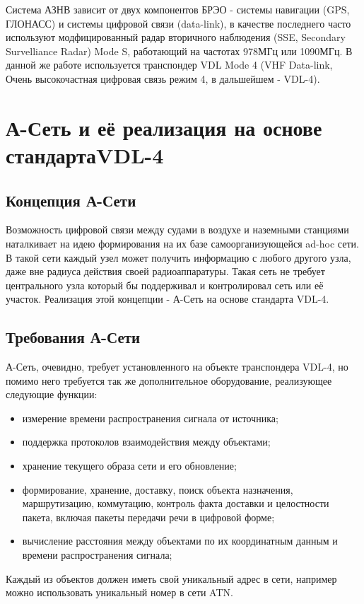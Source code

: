 \documentclass[a4paper,12pt]{report} %
\begin{document}
Система АЗНВ зависит от двух компонентов БРЭО - системы навигации (GPS, ГЛОНАСС)
и системы цифровой связи (data-link), в качестве последнего часто используют
модфицированный радар вторичного наблюдения (SSE, Secondary Survelliance Radar)
Mode S, работающий на частотах 978МГц или 1090МГц. В данной же работе
используется транспондер VDL Mode 4 (VHF Data-link, Очень высокочастная цифровая
связь режим 4, в дальшейшем - VDL-4).
\newpage
\chapter{А-Сеть и её реализация на основе стандарта\newline VDL-4} %

\section{Концепция А-Сети}
Возможность цифровой связи между судами в воздухе и наземными станциями
наталкивает на идею формирования на их базе самоорганизующейся ad-hoc сети. В
такой сети каждый узел может получить информацию с любого другого узла, даже вне
радиуса действия своей радиоаппаратуры. Такая сеть не требует центрального узла
который бы поддерживал и контролировал сеть или её участок. Реализация этой
концепции - А-Сеть на основе стандарта VDL-4.

\section{Требования А-Сети}
А-Сеть, очевидно, требует установленного на объекте транспондера VDL-4, но
помимо него требуется так же дополнительное оборудование, реализующее следующие
функции:
\begin{itemize}
\item измерение времени распространения сигнала от источника;
\item поддержка протоколов взаимодействия между объектами;
\item хранение текущего образа сети и его обновление;
\item формирование, хранение, доставку, поиск объекта назначения, маршрутизацию,
 коммутацию, контроль факта доставки и целостности пакета, включая пакеты
 передачи речи в цифровой форме;
\item вычисление расстояния между объектами по их координатным данным и времени
  распространения сигнала;
\end{itemize}

Каждый из объектов должен иметь свой уникальный адрес в сети, например можно
использовать уникальный номер в сети ATN.
\end{document}

